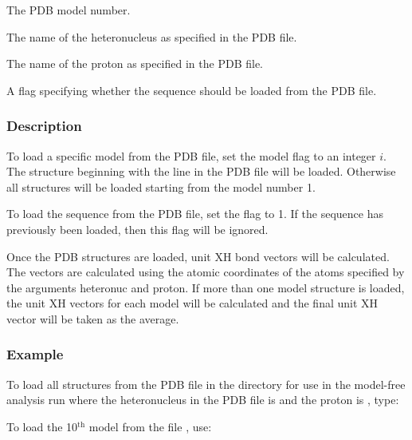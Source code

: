   The PDB  model number.

  The name of the heteronucleus as specified in the PDB  file.

  The name of the proton as specified in the PDB  file.

  A flag specifying whether the sequence  should be loaded from the PDB  file.

\subsubsection{Description}

To load a specific model from the PDB  file, set the model flag to an integer $i$.  The
structure beginning with the line 
 in the PDB  file will be loaded.  Otherwise all
structures will be loaded starting from the model number 1.

To load the sequence  from the PDB  file, set the 
 flag to 1.  If the sequence  has
previously been loaded, then this flag will be ignored.

Once the PDB  structures are loaded, unit XH bond vectors will be calculated.  The vectors
are calculated using the atomic coordinates of the atoms specified by the arguments
heteronuc and proton.  If more than one model structure is loaded, the unit XH vectors for
each model will be calculated and the final unit XH vector will be taken as the average.


\subsubsection{Example}

To load all structures from the PDB  file 
 in the directory 
 for use in the
model-free analysis run 
 where the heteronucleus in the PDB  file is 
 and the proton
is 
, type:





To load the 10$^\mathrm{th}$ model from the file 
, use:

